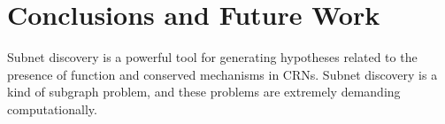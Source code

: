 \documentclass[webpdf,contemporary,large]{oup-authoring-template}
\newcommand{\fig}[1]{
  Fig.~\ref{#1}}
\newcommand{\py}{\texttt{pySubnetSB}}
\theoremstyle{thmstyleone}%
\theoremstyle{thmstyletwo}%
\theoremstyle{thmstylethree}%
\begin{document}

\section{Conclusions and Future Work}
Subnet discovery is a powerful tool for generating hypotheses related to the presence of function and conserved mechanisms in CRNs.
Subnet discovery is a kind of subgraph problem, and these problems are extremely demanding computationally.
\end{document}

